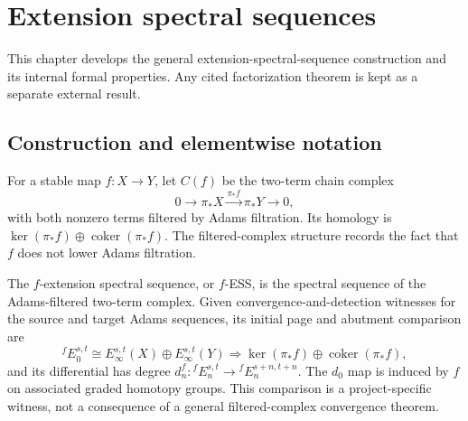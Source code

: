 \chapter{Extension spectral sequences}
\label{chap:extension-ss}

This chapter develops the general extension-spectral-sequence construction and its internal formal properties.  Any cited factorization theorem is kept as a separate external result.

\section{Construction and elementwise notation}

\begin{definition}
  \label{def:filtered-two-term-complex}
  \notready
  For a stable map $f:X\to Y$, let $C(f)$ be the two-term chain complex
  \[
    0\longrightarrow\pi_*X\xrightarrow{\pi_*f}\pi_*Y
      \longrightarrow0,
  \]
  with both nonzero terms filtered by Adams filtration.  Its homology is
  $\ker(\pi_*f)\oplus\operatorname{coker}(\pi_*f)$.  The filtered-complex
  structure records the fact that $f$ does not lower Adams filtration.
\end{definition}

\begin{definition}
  \label{def:f-extension-ss}
  \notready
  The $f$-extension spectral sequence, or $f$-ESS, is the spectral sequence of
  the Adams-filtered two-term complex.  Given convergence-and-detection
  witnesses for the source and target Adams sequences, its initial page and
  abutment comparison are
  \[
    {}^fE_0^{s,t}\cong E_\infty^{s,t}(X)\oplus
      E_\infty^{s,t}(Y)
    \Longrightarrow
    \ker(\pi_*f)\oplus\operatorname{coker}(\pi_*f),
  \]
  and its differential has degree
  $d_n^f:{}^fE_n^{s,t}\to{}^fE_n^{s+n,t+n}$.  The $d_0$ map is induced by
  $f$ on associated graded homotopy groups.  This comparison is a
  project-specific witness, not a consequence of a general filtered-complex
  convergence theorem.
\end{definition}

